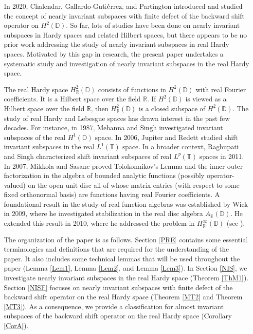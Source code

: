 \documentclass[11pt]{amsart}
\numberwithin{equation}{section}
\begin{document}
 In 2020, Chalendar, Gallardo-Guti$\rm{\acute{e}}$rrez, and Partington \cite{CGP1} introduced and studied the concept of nearly invariant subspaces with finite defect of the backward shift operator on $H^2(\mathbb{D})$. So far, lots of studies have been done on nearly invariant subspaces in Hardy spaces and related Hilbert spaces, but there appears to be no prior work addressing the study of nearly invariant subspaces in real Hardy spaces. Motivated by this gap in research, the present paper undertakes a systematic study and investigation of nearly invariant subspaces in the real Hardy space. 

 The real Hardy space $H^2_\mathbb{R}(\mathbb{D})$ consists of functions in $H^2(\mathbb{D})$ with real Fourier coefficients. It is a Hilbert space over the field $\mathbb{R}$. If $H^2(\mathbb{D})$ is viewed as a Hilbert space over the field $\mathbb{R}$, then $H^2_\mathbb{R}(\mathbb{D})$ is a closed subspace of $H^2(\mathbb{D})$. The study of real Hardy and Lebesgue spaces has drawn interest in the past few decades. For instance, in 1987, Mehanna and Singh \cite{MS} investigated invariant subspaces of the real $H^1(\mathbb{D})$ space. In 2006, Jupiter and Redett \cite{JR} studied shift invariant subspaces in the real $L^1(\mathbb{T})$ space.  In a broader context, Raghupati and Singh \cite{RS} characterized shift invariant subspaces of real $L^p(\mathbb{T})$ spaces in 2011. In 2007, Mikkola and Sasane \cite{Tol} proved Tolokonnikov’s Lemma and the inner-outer factorization in the algebra of bounded analytic functions (possibly operator-valued) on the open unit disc all of whose matrix-entries (with respect to some fixed orthonormal basis) are functions having real Fourier coefficients. A foundational result in the study of real function algebras was established by Wick \cite{BDW} in 2009, where he investigated stabilization in the real disc algebra $A_\mathbb{R}(\mathbb{D})$. He extended this result in 2010, where he addressed the problem in $H_\mathbb{R}^\infty (\mathbb{D})$ (see \cite{BDW1}).
 
 


 The organization of the paper is as follows. Section \ref{PRE} contains some essential terminologies and definitions that are required for the understanding of the paper.  It also includes some technical lemmas that will be used throughout the paper (Lemma \ref{Lem1}, Lemma  \ref{Lem2}, and Lemma \ref{Lem3}). In Section \ref{NIS},  we investigate nearly invariant subspaces in the real Hardy space (Theorem \ref{ThM1}). Section \ref{NISF} focuses on nearly invariant subspaces with finite defect of the backward shift operator on the real Hardy space (Theorem \ref{MT2} and Theorem \ref{MT3}). As a consequence, we provide a classification for almost invariant subspaces of the backward shift operator on the real Hardy space (Corollary \ref{CorA}).
\end{document}
